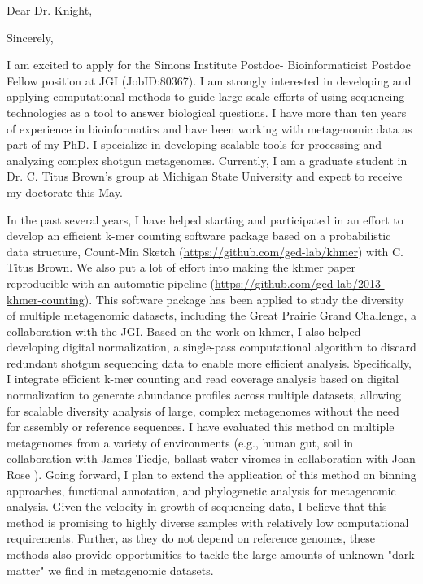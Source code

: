 \documentclass[10pt,a4paper,sans]{moderncv}        %
\begin{document}
\date{November 06, 2014}
\opening{Dear Dr. Knight,}
\closing{Sincerely,}
\makelettertitle

I am excited to apply for the Simons Institute Postdoc- Bioinformaticist Postdoc Fellow position at JGI (JobID:80367).  I am strongly interested in developing and applying computational methods to guide large scale efforts of using sequencing technologies as a tool to answer biological questions.  I have more than ten years of experience in bioinformatics and have been working with metagenomic data as part of my PhD.  I specialize in developing scalable tools for processing and analyzing complex shotgun metagenomes. Currently, I am a graduate student in Dr. C. Titus Brown's group at Michigan State University and expect to receive my doctorate this May.  

In the past several years, I have helped starting and participated in an effort to develop an efficient k-mer counting software package based on a probabilistic data structure, Count-Min Sketch  (\url{https://github.com/ged-lab/khmer}) with C. Titus Brown. We also put a lot of effort into making the khmer paper reproducible with an automatic pipeline (\url{https://github.com/ged-lab/2013-khmer-counting}). This software package has been applied to study the diversity of multiple metagenomic datasets, including the Great Prairie Grand Challenge, a collaboration with the JGI. Based on the work on khmer, I also helped developing digital normalization,  a single-pass computational algorithm to discard redundant shotgun sequencing data to enable more efficient analysis. Specifically, I integrate efficient k-mer counting and read coverage analysis based on digital normalization to generate abundance profiles across multiple datasets, allowing for scalable diversity analysis of large, complex metagenomes without the need for assembly or reference sequences.   I have evaluated this method on multiple metagenomes from a variety of environments (e.g., human gut, soil in collaboration with James Tiedje, ballast water viromes in collaboration with Joan Rose ). Going forward, I plan to extend the application of this method on binning approaches, functional annotation, and phylogenetic analysis for metagenomic analysis. Given the velocity in growth of sequencing data, I believe that this method is promising to highly diverse samples with relatively low computational requirements. Further, as they do not depend on reference genomes, these methods also provide opportunities to tackle the large amounts of unknown "dark matter" we find in metagenomic datasets.
\end{document}
